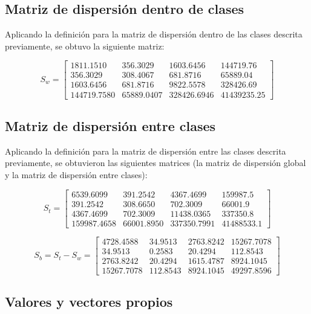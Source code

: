 \documentclass[11pt, letterpaper]{article}
\begin{document}
\subsection{Matriz de dispersión dentro de clases}

Aplicando la definición para la matriz de dispersión dentro de las clases descrita previamente, se obtuvo la siguiente matriz:

$$
S_w = 
\begin{bmatrix}
1811.1510 & 356.3029 & 1603.6456 & 144719.76\\
356.3029 & 308.4067 & 681.8716 & 65889.04\\
1603.6456 & 681.8716 & 9822.5578 & 328426.69\\
144719.7580 & 65889.0407 & 328426.6946 & 41439235.25
\end{bmatrix}
$$

\newpage

\subsection{Matriz de dispersión entre clases}

Aplicando la definición para la matriz de dispersión entre las clases descrita previamente, se obtuvieron las siguientes matrices (la matriz de dispersión global y la matriz de dispersión entre clases):

$$
S_t = 
\begin{bmatrix}
	6539.6099 & 391.2542 & 4367.4699 & 159987.5 \\
	391.2542 & 308.6650 & 702.3009 & 66001.9 \\
	4367.4699 & 702.3009 & 11438.0365 & 337350.8 \\
	159987.4658 & 66001.8950 & 337350.7991 & 41488533.1
\end{bmatrix}
$$

$$
S_b = S_t-S_w = 
\begin{bmatrix}
4728.4588 & 34.9513 & 2763.8242 & 15267.7078 \\
34.9513 & 0.2583 & 20.4294 & 112.8543 \\
2763.8242 & 20.4294 & 1615.4787 & 8924.1045 \\
15267.7078 & 112.8543 & 8924.1045 & 49297.8596
\end{bmatrix}
$$

\newpage


\subsection{Valores y vectores propios}
\end{document}
